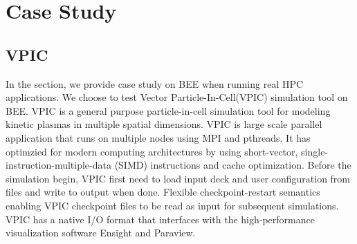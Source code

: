 \section{Case Study}
  \label{sec:case_study}
  \subsection{VPIC}
  In the section, we provide case study on BEE when running real HPC applications. We choose to test Vector Particle-In-Cell(VPIC) simulation tool \cite{bowers20080, bowers2008ultrahigh, bowers2009advances} on BEE. VPIC is a general purpose particle-in-cell simulation tool for modeling kinetic plasmas in multiple spatial dimensions. VPIC is large scale parallel application that runs on multiple nodes using MPI and pthreads. It has optimzied for modern computing architectures by using short-vector, single-instruction-multiple-data (SIMD) instructions and cache optimization. Before the simulation begin, VPIC first need to load input deck and user configuration from files and write to output when done. Flexible checkpoint-restart semantics enabling VPIC checkpoint files to be read as input for subsequent simulations. VPIC has a native I/O format that interfaces with the high-performance visualization software Ensight and Paraview. 
	
